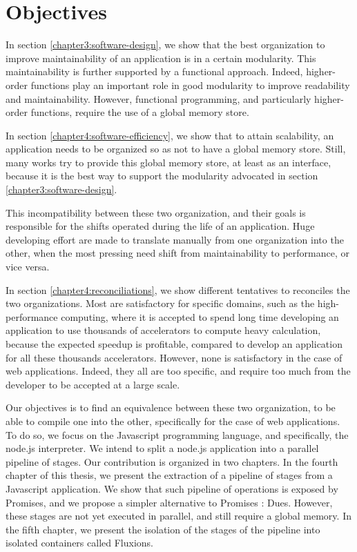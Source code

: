 \section{Objectives}


In section \ref{chapter3:software-design}, we show that the best organization to improve maintainability of an application is in a certain modularity.
This maintainability is further supported by a functional approach.
Indeed, higher-order functions play an important role in good modularity to improve readability and maintainability.
However, functional programming, and particularly higher-order functions, require the use of a global memory store.

In section \ref{chapter4:software-efficiency}, we show that to attain scalability, an application needs to be organized so as not to have a global memory store.
Still, many works try to provide this global memory store, at least as an interface, because it is the best way to support the modularity advocated in section \ref{chapter3:software-design}.

This incompatibility between these two organization, and their goals is responsible for the shifts operated during the life of an application.
Huge developing effort are made to translate manually from one organization into the other, when the most pressing need shift from maintainability to performance, or vice versa.

In section \ref{chapter4:reconciliations}, we show different tentatives to reconciles the two organizations.
Most are satisfactory for specific domains, such as the high-performance computing, where it is accepted to spend long time developing an application to use thousands of accelerators to compute heavy calculation, because the expected speedup is profitable, compared to develop an application for all these thousands accelerators.
However, none is satisfactory in the case of web applications.
Indeed, they all are too specific, and require too much from the developer to be accepted at a large scale.


Our objectives is to find an equivalence between these two organization, to be able to compile one into the other, specifically for the case of web applications.
To do so, we focus on the Javascript programming language, and specifically, the node.js interpreter.
We intend to split a node.js application into a parallel pipeline of stages.
Our contribution is organized in two chapters.
In the fourth chapter of this thesis, we present the extraction of a pipeline of stages from a Javascript application.
We show that such pipeline of operations is exposed by Promises, and we propose a simpler alternative to Promises : Dues.
However, these stages are not yet executed in parallel, and still require a global memory.
In the fifth chapter, we present the isolation of the stages of the pipeline into isolated containers called Fluxions. 

